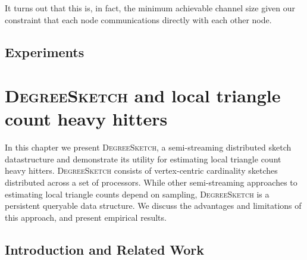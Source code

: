 \documentclass{report}
\newcommand{\algoname}[1]{\textnormal{\textsc{#1}}}
\begin{document}
It turns out that this is, in fact, the minimum achievable channel size  given our constraint that each node communications directly with each other node.


\section{Experiments} \label{async:sec:experiments}











\chapter{\algoname{DegreeSketch} and local triangle count heavy hitters}
 \label{chap:DS}


In this chapter we present \algoname{DegreeSketch}, a semi-streaming distributed sketch datastructure and demonstrate its utility for estimating local triangle count heavy hitters.
\algoname{DegreeSketch} consists of vertex-centric cardinality sketches distributed across a set of processors. 
While other semi-streaming approaches to estimating local triangle counts depend on sampling, \algoname{DegreeSketch} is a persistent queryable data structure.
We discuss the advantages and limitations of this approach, and present empirical results.

\section{Introduction and Related Work}
 \label{DS:sec:DS}
\end{document}
